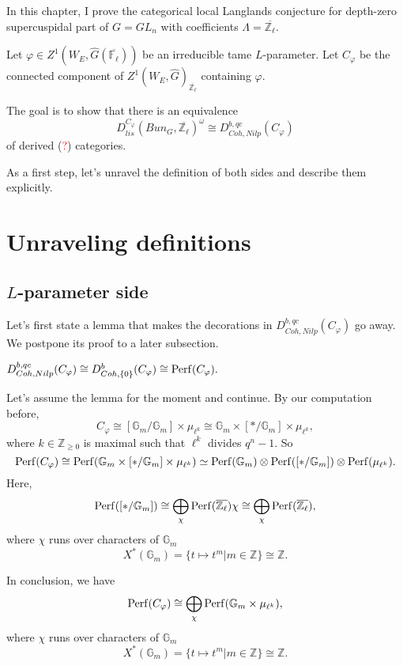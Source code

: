 In this chapter, I prove the categorical local Langlands conjecture for depth-zero supercuspidal part of $G=GL_n$ with coefficients $\Lambda=\overline{\mathbb{Z}_{\ell}}$.

Let $\varphi \in Z^1(W_E, \hat{G}(\overline{\mathbb{F}_{\ell}}))$ be an irreducible tame $L$-parameter. Let $C_{\varphi}$ be the connected component of $Z^1(W_E, \hat{G})_{\overline{\mathbb{Z}_{\ell}}}$ containing $\varphi$. 

The goal is to show that there is an equivalence
$$D_{lis}^{C_{\varphi}}(Bun_G, \overline{\mathbb{Z}_{\ell}})^{\omega} \cong D^{b, qc}_{Coh, Nilp}(C_{\varphi})$$
of derived (\textcolor{red}{?}) categories.

As a first step, let's unravel the definition of both sides and describe them explicitly.

\section{Unraveling definitions}

\subsection{$L$-parameter side}

Let's first state a lemma that makes the decorations in $D^{b, qc}_{Coh, Nilp}(C_{\varphi})$ go away. We postpone its proof to a later subsection.

\begin{lemma} \label{Lemma 1}
	$D^{b, qc}_{Coh, Nilp}(C_{\varphi}) \cong D^b_{Coh, \{0\}}(C_{\varphi}) \cong \operatorname{\operatorname{Perf}}(C_{\varphi}).$
\end{lemma} 
	
Let's assume the lemma for the moment and continue. By our computation before,
$$C_{\varphi} \cong [\mathbb{G}_m/\mathbb{G}_m] \times \mu_{\ell^k} \cong \mathbb{G}_m \times [*/\mathbb{G}_m] \times \mu_{\ell^k},$$
where $k \in \mathbb{Z}_{\geq 0}$ is maximal such that $\ell^k$ divides $q^n-1$. So
$$\operatorname{\operatorname{Perf}}(C_{\varphi}) \cong \operatorname{\operatorname{Perf}}(\mathbb{G}_m \times [*/\mathbb{G}_m] \times \mu_{\ell^k}) \simeq \operatorname{\operatorname{Perf}}(\mathbb{G}_m) \otimes \operatorname{\operatorname{Perf}}([*/\mathbb{G}_m]) \otimes \operatorname{\operatorname{Perf}}(\mu_{\ell^k}).$$
Here,
$$\operatorname{\operatorname{Perf}}([*/\mathbb{G}_m]) \cong \bigoplus_{\chi}\operatorname{\operatorname{Perf}}(\overline{\mathbb{Z}_{\ell}})\chi \cong \bigoplus_{\chi}\operatorname{\operatorname{Perf}}(\overline{\mathbb{Z}_{\ell}}),$$
where $\chi$ runs over characters of $\mathbb{G}_m$ 
$$X^*(\mathbb{G}_m)=\{t \mapsto t^m | m \in \mathbb{Z}\} \cong \mathbb{Z}.$$

In conclusion, we have 
$$\operatorname{\operatorname{Perf}}(C_{\varphi}) \cong \bigoplus_{\chi}\operatorname{\operatorname{Perf}}(\mathbb{G}_m \times \mu_{\ell^k}),$$
where $\chi$ runs over characters of $\mathbb{G}_m$ 
$$X^*(\mathbb{G}_m)=\{t \mapsto t^m | m \in \mathbb{Z}\} \cong \mathbb{Z}.$$


